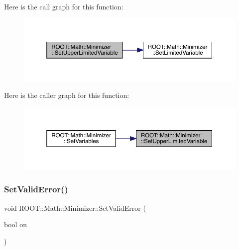 Here is the call graph for this function\+:
\nopagebreak
\begin{figure}[H]
\begin{center}
\leavevmode
\includegraphics[width=350pt]{dc/dc4/classROOT_1_1Math_1_1Minimizer_a804843fbaea82809b3c54232d0c1fe86_cgraph}
\end{center}
\end{figure}
Here is the caller graph for this function\+:
\nopagebreak
\begin{figure}[H]
\begin{center}
\leavevmode
\includegraphics[width=350pt]{dc/dc4/classROOT_1_1Math_1_1Minimizer_a804843fbaea82809b3c54232d0c1fe86_icgraph}
\end{center}
\end{figure}
\mbox{\label{classROOT_1_1Math_1_1Minimizer_a31289e6911a86aba956d0050cee2555b}} 
\subsubsection{\texorpdfstring{SetValidError()}{SetValidError()}\hspace{0.1cm}{\footnotesize\ttfamily [1/3]}}
{\footnotesize\ttfamily void R\+O\+O\+T\+::\+Math\+::\+Minimizer\+::\+Set\+Valid\+Error (\begin{DoxyParamCaption}\item[{bool}]{on }\end{DoxyParamCaption})\hspace{0.3cm}{\ttfamily [inline]}}



